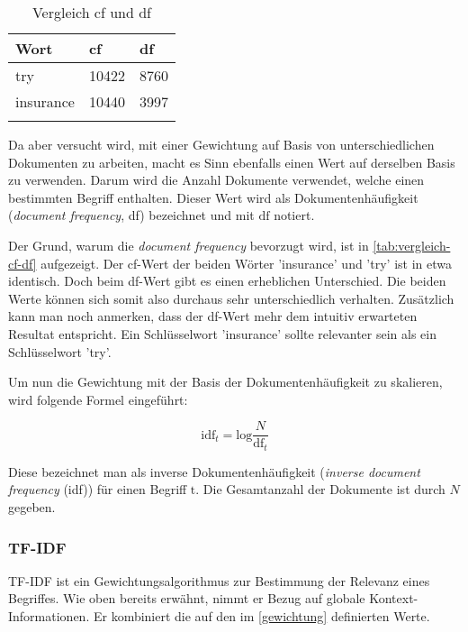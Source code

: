 \begin{longtable}{|p{2cm}| p{1.2cm} | p{1cm}|}
  \hline
    Wort & cf & df \\\hline
    try & 10422 & 8760 \\\hline
    insurance & 10440 & 3997 \\\hline
    \caption{Vergleich cf und df \protect\footnotemark
    }
  \label{tab:vergleich-cf-df}
\end{longtable}


Da aber versucht wird, mit einer Gewichtung auf Basis von unterschiedlichen Dokumenten zu arbeiten, macht es Sinn ebenfalls einen Wert auf derselben Basis zu verwenden. Darum wird die Anzahl Dokumente verwendet, welche einen bestimmten Begriff enthalten. Dieser Wert wird als Dokumentenhäufigkeit (\textit{document frequency}, df) bezeichnet und mit $\text{df}$ notiert.

Der Grund, warum die \textit{document frequency} bevorzugt wird, ist in \autoref{tab:vergleich-cf-df} aufgezeigt. Der cf-Wert der beiden Wörter 'insurance' und 'try' ist in etwa identisch. Doch beim df-Wert gibt es einen erheblichen Unterschied. Die beiden Werte können sich somit also durchaus sehr unterschiedlich verhalten. Zusätzlich kann man noch anmerken, dass der df-Wert mehr dem intuitiv erwarteten Resultat entspricht. Ein Schlüsselwort 'insurance' sollte relevanter sein als ein Schlüsselwort 'try'.

Um nun die Gewichtung mit der Basis der Dokumentenhäufigkeit zu skalieren, wird folgende Formel eingeführt:

\[
\text{idf}_{t}=\text{log}\frac{N}{\text{df}_{t}}
\]

Diese bezeichnet man als inverse Dokumentenhäufigkeit (\textit{inverse document frequency} (idf)) für einen Begriff $\text{t}$. Die Gesamtanzahl der Dokumente ist durch $N$ gegeben.
\\\cite{manning2008introduction}



\subsubsection{TF-IDF}


TF-IDF ist ein Gewichtungsalgorithmus zur Bestimmung der Relevanz eines Begriffes. Wie oben bereits erwähnt, nimmt er Bezug auf globale Kontext-Informationen. Er kombiniert die auf den im \autoref{gewichtung} definierten Werte.


